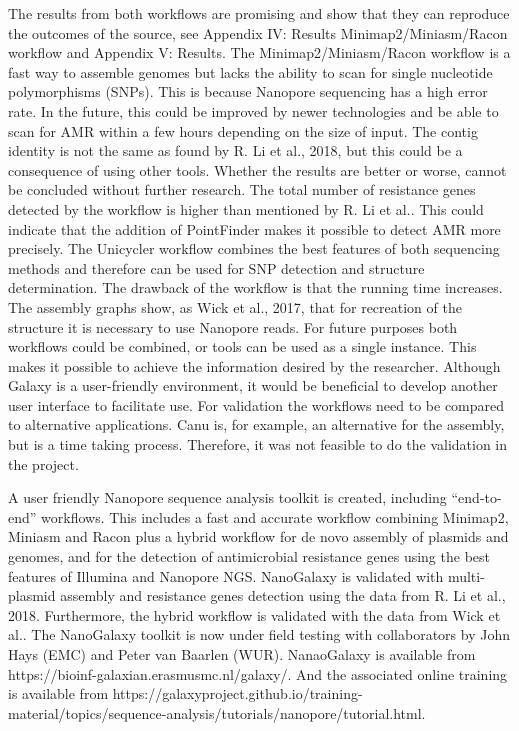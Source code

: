 \documentclass[a4paper,num-refs]{oup-contemporary}
\begin{document}
The results from both workflows are promising and show that they can reproduce the outcomes of the source, see Appendix IV: Results Minimap2/Miniasm/Racon workflow and Appendix V: Results. The Minimap2/Miniasm/Racon workflow is a fast way to assemble genomes but lacks the ability to
scan for single nucleotide polymorphisms (SNPs). This is because Nanopore sequencing has a high error rate. In the future, this could be improved by newer technologies and be able to scan for AMR within a few hours depending on the size of input. The contig identity is not the same as found by R.
Li et al., 2018, but this could be a consequence of using other tools. Whether the results are better or worse, cannot be concluded without further research. The total number of resistance genes detected by the workflow is higher than mentioned by R. Li et al.. This could indicate that the addition of PointFinder makes it possible to detect AMR more precisely. The Unicycler workflow combines the best features of both sequencing methods and therefore can be used for SNP detection and structure determination. The drawback of the workflow is that the running time
increases. The assembly graphs show, as Wick et al., 2017, that for recreation of the structure it is necessary to use Nanopore reads. For future purposes both workflows could be combined, or tools can be used as a single instance. This makes it possible to achieve the information desired by the researcher. Although Galaxy is a user-friendly environment, it would be beneficial to develop another user interface to facilitate use. For validation the workflows need to be compared to alternative applications. Canu is, for example, an alternative for the assembly, but is a time taking
process. Therefore, it was not feasible to do the validation in the project.

A user friendly Nanopore sequence analysis toolkit is created, including “end-to-end” workflows. This includes a fast and accurate workflow combining Minimap2, Miniasm and Racon plus a hybrid workflow for de novo assembly of plasmids and genomes, and for the detection of antimicrobial resistance genes using the best features of Illumina and Nanopore NGS. NanoGalaxy is validated with multi-plasmid assembly and resistance genes detection using the data from R. Li et al., 2018. Furthermore, the hybrid workflow is validated with the data from Wick et al.. The NanoGalaxy toolkit is now under field testing with collaborators by John Hays (EMC) and Peter van Baarlen (WUR). NanaoGalaxy is available from https://bioinf-galaxian.erasmusmc.nl/galaxy/. And the associated online training is available from https://galaxyproject.github.io/training-material/topics/sequence-analysis/tutorials/nanopore/tutorial.html.
\end{document}
